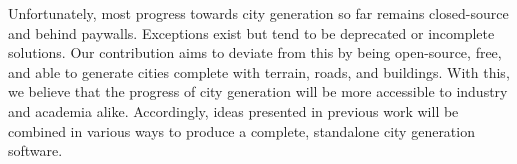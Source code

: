 Unfortunately, most progress towards city generation so far remains closed-source and behind paywalls.
Exceptions exist but tend to be deprecated or incomplete solutions.
Our contribution aims to deviate from this by being open-source, free, and able to generate cities complete with terrain, roads, and buildings.
With this, we believe that the progress of city generation will be more accessible to industry and academia alike.
Accordingly, ideas presented in previous work will be combined in various ways to produce a complete, standalone city generation software.